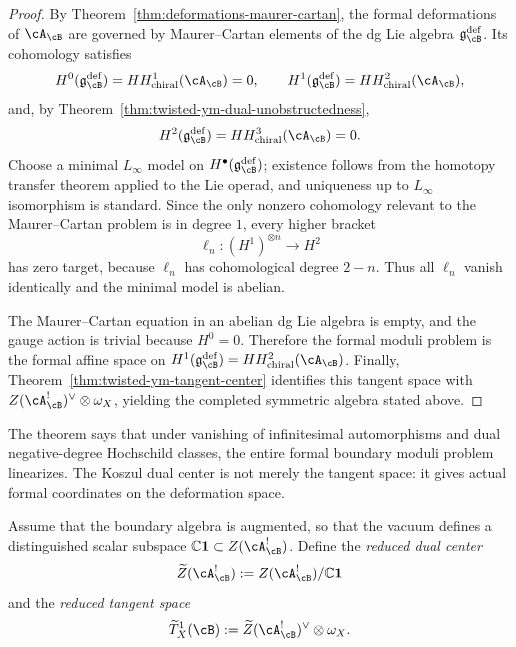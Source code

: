 \begin{proof}
By Theorem~\ref{thm:deformations-maurer-cartan}, the formal deformations of $\cA_{\cB}$ are governed by Maurer--Cartan elements of the dg Lie algebra $\mathfrak{g}^{\mathrm{def}}_{\cB}$.  Its cohomology satisfies
\[
H^0(\mathfrak{g}^{\mathrm{def}}_{\cB}) = HH^{1}_{\mathrm{chiral}}(\cA_{\cB}) = 0,
\qquad
H^1(\mathfrak{g}^{\mathrm{def}}_{\cB}) = HH^{2}_{\mathrm{chiral}}(\cA_{\cB}),
\]
and, by Theorem~\ref{thm:twisted-ym-dual-unobstructedness},
\[
H^2(\mathfrak{g}^{\mathrm{def}}_{\cB}) = HH^{3}_{\mathrm{chiral}}(\cA_{\cB}) = 0.
\]
Choose a minimal $L_\infty$ model on $H^\bullet(\mathfrak{g}^{\mathrm{def}}_{\cB})$; existence follows from the homotopy transfer theorem applied to the Lie operad, and uniqueness up to $L_\infty$ isomorphism is standard.  Since the only nonzero cohomology relevant to the Maurer--Cartan problem is in degree $1$, every higher bracket
\[
\ell_n \colon (H^1)^{\otimes n} \longrightarrow H^{2}
\]
has zero target, because $\ell_n$ has cohomological degree $2-n$.  Thus all $\ell_n$ vanish identically and the minimal model is abelian.

The Maurer--Cartan equation in an abelian dg Lie algebra is empty, and the gauge action is trivial because $H^0=0$.  Therefore the formal moduli problem is the formal affine space on $H^1(\mathfrak{g}^{\mathrm{def}}_{\cB}) = HH^2_{\mathrm{chiral}}(\cA_{\cB})$.  Finally, Theorem~\ref{thm:twisted-ym-tangent-center} identifies this tangent space with $Z(\cA_{\cB}^{!})^{\vee}\otimes\omega_X$, yielding the completed symmetric algebra stated above.
\end{proof}

\begin{remark}[Interpretation]
\label{rem:twisted-ym-central-formality-meaning}
The theorem says that under vanishing of infinitesimal automorphisms and dual negative-degree Hochschild classes, the entire formal boundary moduli problem linearizes.  The Koszul dual center is not merely the tangent space: it gives actual formal coordinates on the deformation space.
\end{remark}

\begin{definition}
\label{def:twisted-ym-reduced-center}
Assume that the boundary algebra is augmented, so that the vacuum defines a distinguished scalar subspace $\mathbb{C}\mathbf{1} \subset Z(\cA_{\cB}^{!})$.  Define the \emph{reduced dual center}
\[
\widetilde Z(\cA_{\cB}^{!}) := Z(\cA_{\cB}^{!})/\mathbb{C}\mathbf{1}
\]
and the \emph{reduced tangent space}
\[
\widetilde T^1_X(\cB) := \widetilde Z(\cA_{\cB}^{!})^{\vee}\otimes \omega_X.
\]
\end{definition}

